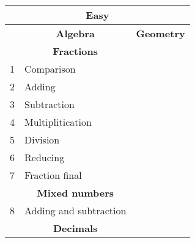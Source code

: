 \documentclass[a4paper]{article}
\begin{document}
\begin{center}

\begin{table}[]
    \begin{tabular}{|lll|}
    \hline
    \multicolumn{3}{|c|}{\textbf{Easy}}                                                                                              \\ \hline
    \multicolumn{1}{|l|}{}   & \multicolumn{1}{c|}{\textbf{Algebra}}                  & \multicolumn{1}{c|}{\textbf{Geometry}}       \\ \hline
    \multicolumn{1}{|l|}{}   & \multicolumn{1}{c|}{\textbf{Fractions}}                &                                              \\ \hline
    \multicolumn{1}{|l|}{1}  & \multicolumn{1}{l|}{Comparison}                        &                                              \\ \hline
    \multicolumn{1}{|l|}{2}  & \multicolumn{1}{l|}{Adding}                            &                                              \\ \hline
    \multicolumn{1}{|l|}{3}  & \multicolumn{1}{l|}{Subtraction}                       &                                              \\ \hline
    \multicolumn{1}{|l|}{4}  & \multicolumn{1}{l|}{Multiplitication}                  &                                              \\ \hline
    \multicolumn{1}{|l|}{5}  & \multicolumn{1}{l|}{Division}                          &                                              \\ \hline
    \multicolumn{1}{|l|}{6}  & \multicolumn{1}{l|}{Reducing}                          &                                              \\ \hline
    \multicolumn{1}{|l|}{7}  & \multicolumn{1}{l|}{Fraction final}                    &                                              \\ \hline
    \multicolumn{1}{|l|}{}   & \multicolumn{1}{c|}{\textbf{Mixed numbers}}            &                                              \\ \hline
    \multicolumn{1}{|l|}{8}  & \multicolumn{1}{l|}{Adding and subtraction}            &                                              \\ \hline
    \multicolumn{1}{|l|}{}   & \multicolumn{1}{c|}{\textbf{Decimals}}                 &                                              \\ \hline

\end{tabular}
\end{table}
\end{center}
\end{document}
